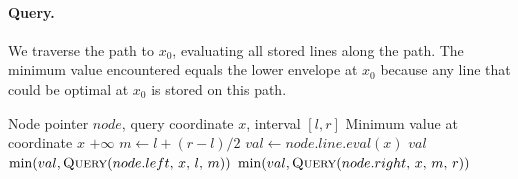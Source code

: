 \documentclass[11pt,a4paper]{article}
\theoremstyle{definition}
\theoremstyle{plain}
\begin{document}
\paragraph{Query.} We traverse the path to $x_0$, evaluating all stored lines along the path. The minimum value encountered equals the lower envelope at $x_0$ because any line that could be optimal at $x_0$ is stored on this path.

\begin{algorithm}[H]
\caption{LICT Query}
\label{alg:query}
\begin{algorithmic}[1]
\Require Node pointer $node$, query coordinate $x$, interval $[l, r]$
\Ensure Minimum value at coordinate $x$
\State \Return $+\infty$
\EndIf
\State $m \gets l + (r - l) / 2$
\State $val \gets node.line.eval(x)$
\State \Return $val$
\EndIf
{}
\State \Return $\min(val, \text{\Call{Query}{$node.left$, $x$, $l$, $m$}})$
\Else
\State \Return $\min(val, \text{\Call{Query}{$node.right$, $x$, $m$, $r$}})$
\EndIf
\end{algorithmic}
\end{algorithm}
\end{document}
